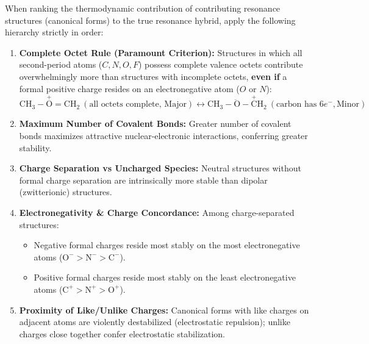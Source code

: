 \documentclass[10pt,a4paper]{article}
\begin{document}
\begin{formulabox}
When ranking the thermodynamic contribution of contributing resonance structures (canonical forms) to the true resonance hybrid, apply the following hierarchy strictly in order:
\begin{enumerate}[leftmargin=*]
  \item \textbf{Complete Octet Rule (Paramount Criterion):} Structures in which all second-period atoms ($C, N, O, F$) possess complete valence octets contribute overwhelmingly more than structures with incomplete octets, \textbf{even if} a formal positive charge resides on an electronegative atom ($O$ or $N$):
  \begin{equation}
    \mathrm{CH_3-\overset{+}{O}=CH_2} \ (\text{all octets complete, Major}) \longleftrightarrow \mathrm{CH_3-\ddot{O}-\overset{+}{C}H_2} \ (\text{carbon has } 6e^-, \text{Minor})
  \end{equation}
  \item \textbf{Maximum Number of Covalent Bonds:} Greater number of covalent bonds maximizes attractive nuclear-electronic interactions, conferring greater stability.
  \item \textbf{Charge Separation vs Uncharged Species:} Neutral structures without formal charge separation are intrinsically more stable than dipolar (zwitterionic) structures.
  \item \textbf{Electronegativity \& Charge Concordance:} Among charge-separated structures:
  \begin{itemize}
    \item Negative formal charges reside most stably on the most electronegative atoms ($\mathrm{O^-} > \mathrm{N^-} > \mathrm{C^-}$).
    \item Positive formal charges reside most stably on the least electronegative atoms ($\mathrm{C^+} > \mathrm{N^+} > \mathrm{O^+}$).
  \end{itemize}
  \item \textbf{Proximity of Like/Unlike Charges:} Canonical forms with like charges on adjacent atoms are violently destabilized (electrostatic repulsion); unlike charges close together confer electrostatic stabilization.
\end{enumerate}
\end{formulabox}
\end{document}
